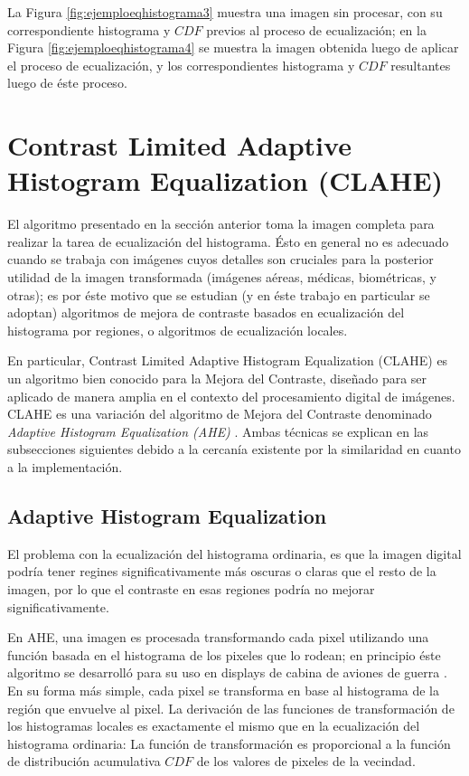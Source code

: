 La Figura \ref{fig:ejemploeqhistograma3} muestra una imagen sin procesar, con su correspondiente histograma y $CDF$ previos al proceso de ecualización; en la Figura \ref{fig:ejemploeqhistograma4} se muestra la imagen obtenida luego de aplicar el proceso de ecualización, y los correspondientes histograma y $CDF$ resultantes luego de éste proceso. 

\section{Contrast Limited Adaptive Histogram Equalization (CLAHE)}

El algoritmo presentado en la sección anterior toma la imagen completa para realizar la tarea de ecualización del histograma. Ésto en general no es adecuado cuando se trabaja con imágenes cuyos detalles son cruciales para la posterior utilidad de la imagen transformada (imágenes aéreas, médicas, biométricas, y otras); es por éste motivo que se estudian (y en éste trabajo en particular se adoptan) algoritmos de mejora de contraste basados en ecualización del histograma por regiones, o algoritmos de ecualización locales.

En particular, Contrast Limited Adaptive Histogram Equalization (CLAHE) \cite{zuiderveld1994contrast} es un algoritmo bien conocido para la Mejora del Contraste, diseñado para ser aplicado de manera amplia en el contexto del procesamiento digital de imágenes. CLAHE es una variación del algoritmo de Mejora del Contraste denominado \textit{Adaptive Histogram Equalization (AHE)} \cite{pizer1987adaptive}. Ambas técnicas se explican en las subsecciones siguientes debido a la cercanía existente por la similaridad en cuanto a la implementación.

\subsection{Adaptive Histogram Equalization}

El problema con la ecualización del histograma ordinaria, es que la imagen digital podría tener regines significativamente más oscuras o claras que el resto de la imagen, por lo que el contraste en esas regiones podría no mejorar significativamente.

En AHE, una imagen es procesada transformando cada pixel utilizando una función basada en el histograma de los pixeles que lo rodean; en principio éste algoritmo se desarrolló para su uso en displays de cabina de aviones de guerra \cite{ketcham1974image}. En su forma más simple, cada pixel se transforma en base al histograma de la región que envuelve al pixel. La derivación de las funciones de transformación de los histogramas locales es exactamente el mismo que en la ecualización del histograma ordinaria: La función de transformación es proporcional a la función de distribución acumulativa $CDF$ de los valores de pixeles de la vecindad. 

